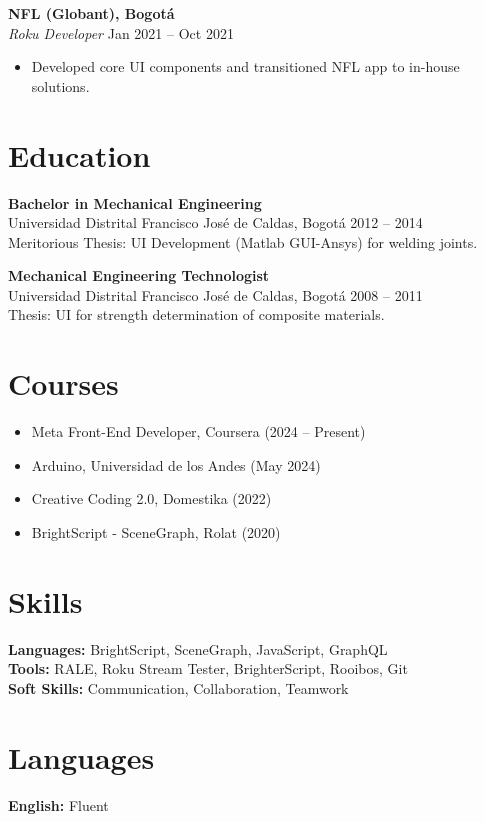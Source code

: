 \documentclass[11pt,a4paper]{article}
\begin{document}
\textbf{NFL (Globant), Bogotá} \\
\emph{Roku Developer} \hfill Jan 2021 -- Oct 2021 \\
\begin{itemize}[leftmargin=*]
    \item Developed core UI components and transitioned NFL app to in-house solutions.
\end{itemize}

\section*{Education}
\textbf{Bachelor in Mechanical Engineering} \\
Universidad Distrital Francisco José de Caldas, Bogotá \hfill 2012 -- 2014 \\
Meritorious Thesis: UI Development (Matlab GUI-Ansys) for welding joints.

\textbf{Mechanical Engineering Technologist} \\
Universidad Distrital Francisco José de Caldas, Bogotá \hfill 2008 -- 2011 \\
Thesis: UI for strength determination of composite materials.

\section*{Courses}
\begin{itemize}[leftmargin=*]
    \item Meta Front-End Developer, Coursera (2024 -- Present)
    \item Arduino, Universidad de los Andes (May 2024)
    \item Creative Coding 2.0, Domestika (2022)
    \item BrightScript - SceneGraph, Rolat (2020)
\end{itemize}

\section*{Skills}
\textbf{Languages:} BrightScript, SceneGraph, JavaScript, GraphQL \\
\textbf{Tools:} RALE, Roku Stream Tester, BrighterScript, Rooibos, Git \\
\textbf{Soft Skills:} Communication, Collaboration, Teamwork

\section*{Languages}
\textbf{English:} Fluent
\end{document}
